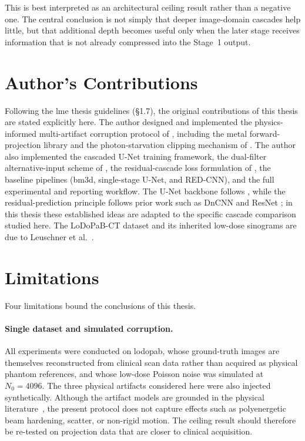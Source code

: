 This is best interpreted as an architectural ceiling result rather than a negative one. The central conclusion is not simply that deeper image-domain cascades help little, but that additional depth becomes useful only when the later stage receives information that is not already compressed into the Stage~1 output.

\section{Author's Contributions}
\label{sec:conc_originality}

Following the \gls{lme} thesis guidelines (§1.7), the original contributions of this thesis are stated explicitly here. The author designed and implemented the physics-informed multi-artifact corruption protocol of , including the metal forward-projection library and the photon-starvation clipping mechanism of . The author also implemented the cascaded U-Net training framework, the dual-filter alternative-input scheme of , the residual-cascade loss formulation of , the baseline pipelines (\gls{bm3d}, single-stage U-Net, and RED-CNN), and the full experimental and reporting workflow. The U-Net backbone follows \cite{Ronneberger2015}, while the residual-prediction principle follows prior work such as DnCNN \cite{Zhang2017} and ResNet \cite{He2016}; in this thesis these established ideas are adapted to the specific cascade comparison studied here. The LoDoPaB-CT dataset and its inherited low-dose sinograms are due to Leuschner et al.~\cite{Leuschner2021}.

\section{Limitations}
\label{sec:conc_limitations}

Four limitations bound the conclusions of this thesis.

\paragraph{Single dataset and simulated corruption.}
All experiments were conducted on \gls{lodopab}, whose ground-truth images are themselves reconstructed from clinical scan data rather than acquired as physical phantom references, and whose low-dose Poisson noise was simulated at $N_0=\num{4096}$. The three physical artifacts considered here were also injected synthetically. Although the artifact models are grounded in the physical literature~\cite{LuMackie2002, Mao2007, Sijbers2004, Prell2009, Gjesteby2016}, the present protocol does not capture effects such as polyenergetic beam hardening, scatter, or non-rigid motion. The ceiling result should therefore be re-tested on projection data that are closer to clinical acquisition.

